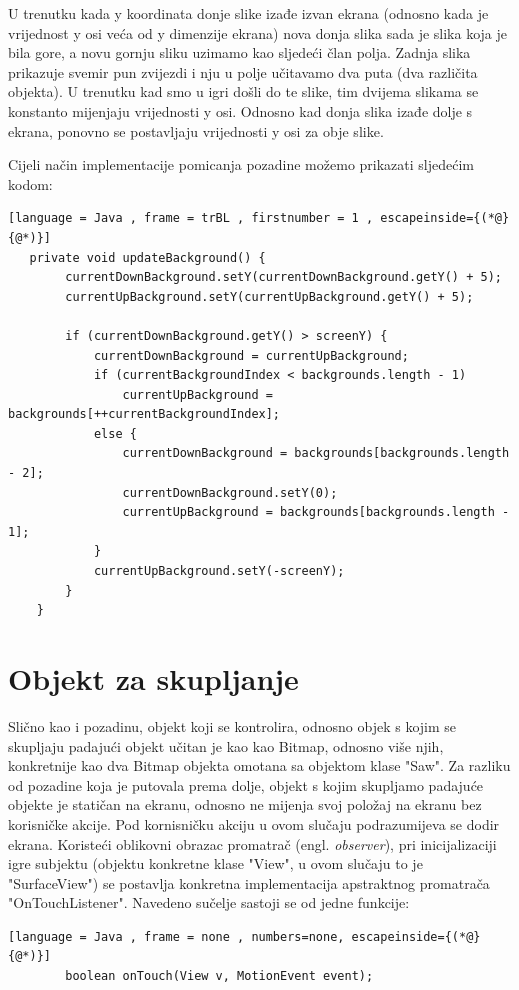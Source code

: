 \documentclass[times, utf8, zavrsni]{fer}
\begin{document}
	
	U trenutku kada y koordinata donje slike izađe izvan ekrana (odnosno kada je vrijednost y osi veća od y dimenzije ekrana) nova donja slika sada je slika koja je bila gore, a novu gornju sliku uzimamo 
	kao sljedeći član polja. 
	Zadnja slika prikazuje svemir pun zvijezdi i nju u polje učitavamo dva puta (dva različita objekta). U trenutku kad smo u igri došli do te slike, tim dvijema slikama se konstanto mijenjaju vrijednosti y osi.
	Odnosno kad donja slika izađe dolje s ekrana, ponovno se postavljaju vrijednosti y osi za obje slike. 
	
	
	Cijeli način implementacije pomicanja pozadine možemo prikazati sljedećim kodom:
	
	\begin{lstlisting}[language = Java , frame = trBL , firstnumber = 1 , escapeinside={(*@}{@*)}]
   private void updateBackground() {
        currentDownBackground.setY(currentDownBackground.getY() + 5);
        currentUpBackground.setY(currentUpBackground.getY() + 5);

        if (currentDownBackground.getY() > screenY) {
            currentDownBackground = currentUpBackground;
            if (currentBackgroundIndex < backgrounds.length - 1)     
                currentUpBackground = backgrounds[++currentBackgroundIndex]; 
            else {
                currentDownBackground = backgrounds[backgrounds.length - 2];
                currentDownBackground.setY(0);
                currentUpBackground = backgrounds[backgrounds.length - 1];
            }
            currentUpBackground.setY(-screenY);
        }
    }
	\end{lstlisting}


	\section{Objekt za skupljanje}
	Slično kao i pozadinu, objekt koji se kontrolira, odnosno objek s kojim se skupljaju padajući objekt učitan je kao kao Bitmap, odnosno više njih, konkretnije kao dva Bitmap objekta omotana sa objektom
	klase "Saw". Za razliku od pozadine koja je putovala prema dolje, objekt s kojim skupljamo padajuće objekte je statičan na ekranu, odnosno ne mijenja svoj položaj na ekranu bez korisničke akcije. Pod kornisničku akciju u 
	ovom slučaju podrazumijeva se dodir ekrana. Koristeći oblikovni obrazac promatrač (engl. \textit{observer}), pri inicijalizaciji igre  subjektu (objektu konkretne klase "View", u ovom slučaju to je "SurfaceView")
	se postavlja konkretna implementacija apstraktnog promatrača "OnTouchListener". Navedeno sučelje sastoji se od jedne funkcije:
	\begin{lstlisting}[language = Java , frame = none , numbers=none, escapeinside={(*@}{@*)}]
		boolean onTouch(View v, MotionEvent event); 
	\end{lstlisting}
	
\end{document}
